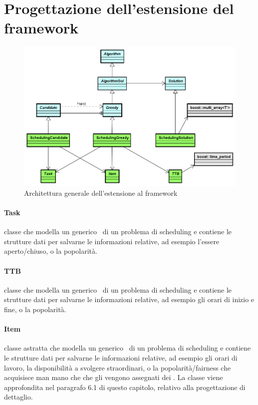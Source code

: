\section{Progettazione dell'estensione del framework}
\begin{figure}[!h]
    \begin{widepage}
        \includegraphics[width=14.9cm,keepaspectratio]{../immagini/progettazione/estensione.png}
        \caption{Architettura generale dell'estensione al framework}
    \end{widepage}
\end{figure}
\FloatBarrier
\noindent
\paragraph{Task} classe che modella un generico \task\ di un problema di scheduling e contiene le strutture dati per salvarne le informazioni relative, ad esempio l'essere aperto/chiuso, o la popolarità.
\paragraph{TTB} classe che modella un generico \ttb\ di un problema di scheduling e contiene le strutture dati per salvarne le informazioni relative, ad esempio gli orari di inizio e fine, o la popolarità.
\paragraph{Item} classe astratta che modella un generico \items\ di un problema di scheduling e contiene le strutture dati per salvarne le informazioni relative, ad esempio gli orari di lavoro, la disponibilità a svolgere straordinari, o la popolarità/fairness che acquisisce man mano che che gli vengono assegnati dei \task. La classe viene approfondita nel paragrafo 6.1 di questo capitolo, relativo alla progettazione di dettaglio.
